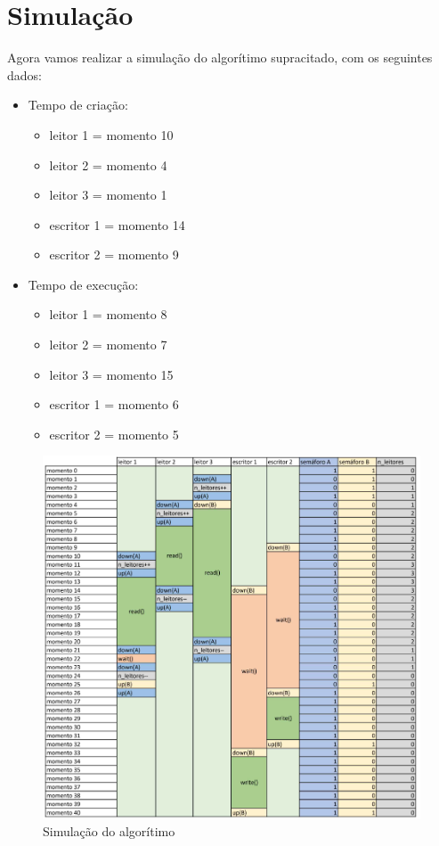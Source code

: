 \documentclass[12pt, a4paper]{article}
\begin{document}
\section{Simulação}

Agora vamos realizar a simulação do algorítimo supracitado, com os seguintes dados:

\begin{multicols}{2}
\begin{itemize}
\footnotesize
	\item Tempo de criação:
	\begin{itemize}
			\item leitor 1 = momento 10
			\item leitor 2 = momento 4
			\item leitor 3 = momento 1
			\item escritor 1 = momento 14
			\item escritor 2 = momento 9
	\end{itemize}
	\item Tempo de execução:
		\begin{itemize}
			\item leitor 1 = momento 8
			\item leitor 2 = momento 7
			\item leitor 3 = momento 15
			\item escritor 1 = momento 6
			\item escritor 2 = momento 5
		\end{itemize}
\end{itemize}
\end{multicols}

\begin{figure}[!htb]
	\centering
	\includegraphics[keepaspectratio,scale=.5]{silulation.png}
	\caption{\label{fig:silulation.png}Simulação do algorítimo}
\end{figure}
\end{document}
